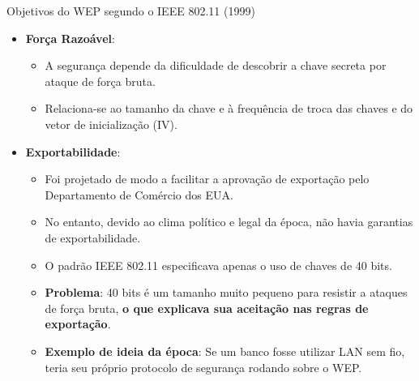 \begin{frame}{Objetivos do WEP segundo o IEEE 802.11 (1999)}
\begin{itemize}
\item \textbf{Força Razoável}:
\begin{itemize}
    \item A segurança depende da dificuldade de descobrir a chave secreta por ataque de força bruta.  
    \item Relaciona-se ao tamanho da chave e à frequência de troca das chaves e do vetor de inicialização (IV).
\end{itemize}

\end{itemize}

\begin{itemize}
\item \textbf{Exportabilidade}:
\begin{itemize}
    \item Foi projetado de modo a facilitar a aprovação de exportação pelo Departamento de Comércio dos EUA.  
    \item No entanto, devido ao clima político e legal da época, não havia garantias de exportabilidade.
     \item O padrão IEEE 802.11 especificava apenas o uso de chaves de 40 bits.
    \item \textbf{Problema}: 40 bits é um tamanho muito pequeno para resistir a ataques de força bruta, \textbf{o que explicava sua aceitação nas regras de exportação}.
    \item \textbf{Exemplo de ideia da época}: Se um banco fosse utilizar LAN sem fio, teria seu próprio protocolo de segurança rodando sobre o WEP.
\end{itemize}

\end{itemize}


\end{frame}







